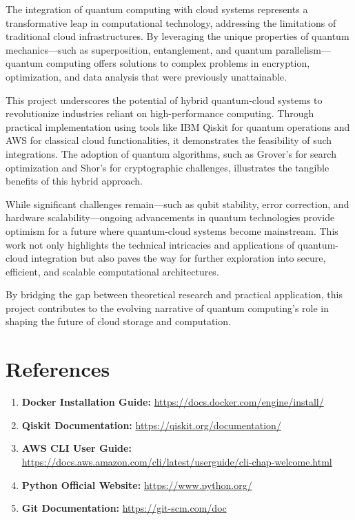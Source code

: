 \documentclass[12pt,a4paper]{article}
\begin{document}
The integration of quantum computing with cloud systems represents a transformative leap in computational technology, addressing the limitations of traditional cloud infrastructures. By leveraging the unique properties of quantum mechanics—such as superposition, entanglement, and quantum parallelism—quantum computing offers solutions to complex problems in encryption, optimization, and data analysis that were previously unattainable.

This project underscores the potential of hybrid quantum-cloud systems to revolutionize industries reliant on high-performance computing. Through practical implementation using tools like IBM Qiskit for quantum operations and AWS for classical cloud functionalities, it demonstrates the feasibility of such integrations. The adoption of quantum algorithms, such as Grover's for search optimization and Shor's for cryptographic challenges, illustrates the tangible benefits of this hybrid approach.

While significant challenges remain—such as qubit stability, error correction, and hardware scalability—ongoing advancements in quantum technologies provide optimism for a future where quantum-cloud systems become mainstream. This work not only highlights the technical intricacies and applications of quantum-cloud integration but also paves the way for further exploration into secure, efficient, and scalable computational architectures.

By bridging the gap between theoretical research and practical application, this project contributes to the evolving narrative of quantum computing's role in shaping the future of cloud storage and computation.

\newpage

\begin{center}
    \fontsize{14}{16}\selectfont \bfseries
    \section{References}
\end{center}


\begin{enumerate}
    \item \textbf{Docker Installation Guide:} \url{https://docs.docker.com/engine/install/}
    \item \textbf{Qiskit Documentation:} \url{https://qiskit.org/documentation/}
    \item \textbf{AWS CLI User Guide:} \url{https://docs.aws.amazon.com/cli/latest/userguide/cli-chap-welcome.html}
    \item \textbf{Python Official Website:} \url{https://www.python.org/}
    \item \textbf{Git Documentation:} \url{https://git-scm.com/doc}
\end{enumerate}


\end{document}
